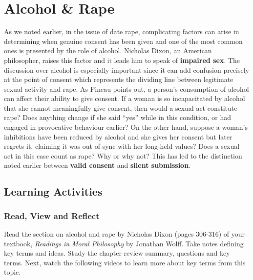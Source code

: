 \documentclass[
]{book}
\begin{document}
\hypertarget{alcohol-rape}{%
\section*{Alcohol \& Rape}\label{alcohol-rape}}

As we noted earlier, in the issue of date rape, complicating factors can arise in determining when genuine consent has been given and one of the most common ones is presented by the role of alcohol. Nicholas Dixon, an American philosopher, raises this factor and it leads him to speak of \textbf{impaired sex}. The discussion over alcohol is especially important since it can add confusion precisely at the point of consent which represents the dividing line between legitimate sexual activity and rape. As Pineau points out, a person's consumption of alcohol can affect their ability to give consent.
If a woman is so incapacitated by alcohol that she cannot meaningfully give consent, then would a sexual act constitute rape? Does anything change if she said ``yes'' while in this condition, or had engaged in provocative behaviour earlier?
On the other hand, suppose a woman's inhibitions have been reduced by alcohol and she gives her consent but later regrets it, claiming it was out of sync with her long-held values? Does a sexual act in this case count as rape? Why or why not?
This has led to the distinction noted earlier between \textbf{valid consent} and \textbf{silent submission}.

\hypertarget{learning-activities-14}{%
\subsection*{Learning Activities}\label{learning-activities-14}}

\begin{reflect}
\hypertarget{read-view-and-reflect-19}{%
\subsubsection*{Read, View and Reflect}\label{read-view-and-reflect-19}}

Read the section on alcohol and rape by Nicholas Dixon (pages 306-316) of your textbook, \emph{Readings in Moral Philosophy} by Jonathan Wolff. Take notes defining key terms and ideas. Study the chapter review summary, questions and key terms.
Next, watch the following videos to learn more about key terms from this topic.
\end{reflect}
\end{document}
